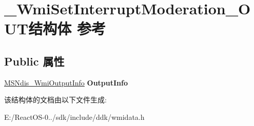 \hypertarget{struct___wmi_set_interrupt_moderation___o_u_t}{}\section{\+\_\+\+Wmi\+Set\+Interrupt\+Moderation\+\_\+\+O\+U\+T结构体 参考}
\label{struct___wmi_set_interrupt_moderation___o_u_t}
\subsection*{Public 属性}
\begin{DoxyCompactItemize}
\item 
\mbox{\label{struct___wmi_set_interrupt_moderation___o_u_t_a8a17da3da776f73d6456434b8f0d708a}} 
\hyperlink{struct___m_s_ndis___wmi_output_info}{M\+S\+Ndis\+\_\+\+Wmi\+Output\+Info} {\bfseries Output\+Info}
\end{DoxyCompactItemize}


该结构体的文档由以下文件生成\+:\begin{DoxyCompactItemize}
\item 
E\+:/\+React\+O\+S-\/0../sdk/include/ddk/wmidata.\+h\end{DoxyCompactItemize}
